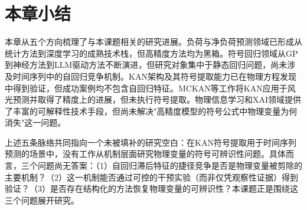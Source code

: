 \section{本章小结}

本章从五个方向梳理了与本课题相关的研究进展。负荷与净负荷预测领域已形成从统计方法到深度学习的成熟技术栈，但高精度方法均为黑箱。符号回归领域从GP到神经方法到LLM驱动方法不断演进，但研究对象集中于静态回归问题，尚未涉及时间序列中的自回归竞争机制。KAN架构及其符号提取能力已在物理方程发现中得到验证，但成功案例均不包含自回归特征。MCKAN等工作将KAN应用于风光预测并取得了精度上的进展，但未执行符号提取。物理信息学习和XAI领域提供了丰富的可解释性技术手段，但尚未解决"高精度模型的符号公式中物理变量为何消失"这一问题。

上述五条脉络共同指向一个未被填补的研究空白：在KAN符号提取用于时间序列预测的场景中，没有工作从机制层面研究物理变量的符号可辨识性问题。具体而言，三个问题尚无答案：（1）自回归滞后特征的捷径竞争是否是物理变量被剪除的主要机制？（2）这一机制能否通过可控的干预实验（而非仅凭观察性证据）得到验证？（3）是否存在结构化的方法恢复物理变量的可辨识性？本课题正是围绕这三个问题展开研究。

